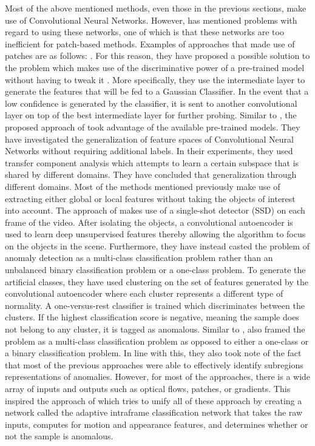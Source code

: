 Most of the above mentioned methods, even those in the previous sections, make use of Convolutional Neural Networks. However,  has mentioned problems with regard to using these networks, one of which is that these networks are too inefficient for patch-based methods. Examples of approaches that made use of patches are as follows: . For this reason, they have proposed a possible solution to the problem which makes use of the discriminative power of a pre-trained model without having to tweak it . More specifically, they use the intermediate layer to generate the features that will be fed to a Gaussian Classifier. In the event that a low confidence is generated by the classifier, it is sent to another convolutional layer on top of the best intermediate layer for further probing. 
Similar to , the proposed approach of  took advantage of the available pre-trained models. They have investigated the generalization of feature spaces of Convolutional Neural Networks without requiring additional labels. In their experiments, they used transfer component analysis  which attempts to learn a certain subspace that is shared by different domains. They have concluded that generalization through different domains.
Most of the methods mentioned previously make use of extracting either global or local features without taking the objects of interest into account. The approach of  makes use of a single-shot detector (SSD)  on each frame of the video. After isolating the objects, a convolutional autoencoder is used to learn deep unsupervised features thereby allowing the algorithm to focus on the objects in the scene. Furthermore, they have instead casted the problem of anomaly detection as a multi-class classification problem rather than an unbalanced binary classification problem or a one-class problem. To generate the artificial classes, they have used clustering on the set of features generated by the convolutional autoencoder where each cluster represents a different type of normality. A one-versus-rest classifier is trained which discriminates between the clusters. If the highest classification score is negative, meaning the sample does not belong to any cluster, it is tagged as anomalous. 
Similar to ,  also framed the problem as a multi-class classification problem as opposed to either a one-class or a binary classification problem. In line with this, they also took note of the fact that most of the previous approaches were able to effectively identify subregions representations of anomalies. However, for most of the approaches, there is a wide array of inputs and outputs such as optical flows, patches, or gradients. This inspired the approach of  which tries to unify all of these approach by creating a network called the adaptive intraframe classification network that takes the raw inputs, computes for motion and appearance features, and determines whether or not the sample is anomalous.


